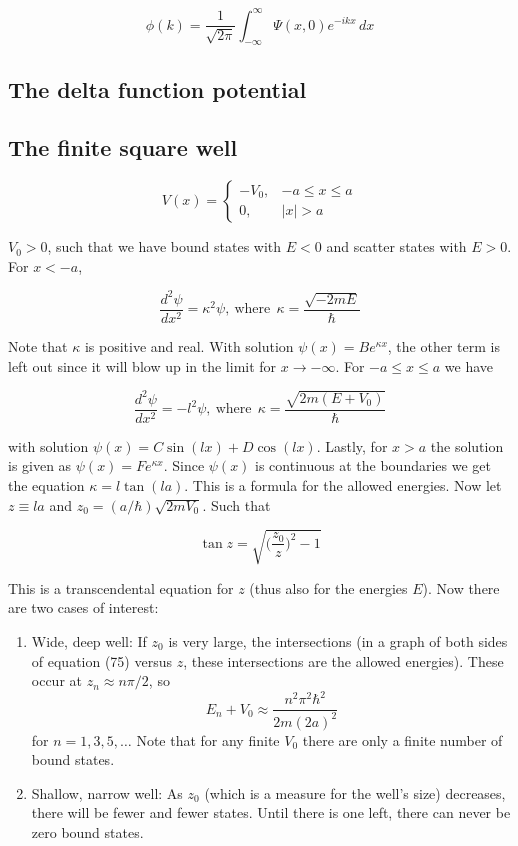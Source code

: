 \documentclass[a4paper]{article}
\begin{document}
\begin{equation}
	\phi(k)=\frac{1}{\sqrt{2\pi}}\int_{-\infty}^{\infty}\Psi(x,0)e^{-ikx}\,dx
\end{equation}

\subsection{The delta function potential}

\subsection{The finite square well}

\[V(x) = \left\{
\begin{array}{lr}
-V_0, &-a \le x \le a\\
0, &|x|>a
\end{array}
\right.
\]

$V_0>0$, such that we have bound states with $E<0$ and scatter states with $E>0$. For $x<-a$, 

\begin{equation}
	\frac{d^2\psi}{dx^2}=\kappa^2\psi, \ \text{where}\ \ \kappa=\frac{\sqrt{-2mE}}{\hbar}
\end{equation}

Note that $\kappa$ is positive and real. With solution $\psi(x)=Be^{\kappa x}$, the other term is left out since it will blow up in the limit for $x\rightarrow -\infty$. For $-a\le x\le a$ we have


\begin{equation}
\frac{d^2\psi}{dx^2}=-l^2\psi, \ \text{where}\ \ \kappa=\frac{\sqrt{2m(E+V_0)}}{\hbar}
\end{equation}

with solution $\psi(x)=C\sin(lx)+D\cos(lx)$. Lastly, for $x>a$ the solution is given as $\psi(x)=Fe^{\kappa x}$. Since $\psi(x)$ is continuous at the boundaries we get the equation $\kappa=l\tan(la)$. This is a formula for the allowed energies. Now let $z\equiv la$ and $z_0=(a/\hbar )\sqrt{2mV_0}$. Such that 

\begin{equation}
	\tan z = \sqrt{\bigg(\frac{z_0}{z}\bigg)^2-1}
\end{equation}

This is a transcendental equation for $z$ (thus also for the energies $E$). Now there are two cases of interest:

\begin{enumerate}
	\item Wide, deep well: If $z_0$ is very large, the intersections (in a graph of both sides of equation (75) versus $z$, these intersections are the allowed energies). These occur at $z_n\approx n\pi/2$, so $$E_n+V_0\approx\frac{n^2\pi^2\hbar^2}{2m(2a)^2}$$ for $n=1,3,5,\dots$ Note that for any finite $V_0$ there are only a finite number of bound states.
	\item Shallow, narrow well: As $z_0$ (which is a measure for the well's size) decreases, there will be fewer and fewer states. Until there is one left, there can never be zero bound states.  
\end{enumerate}
\end{document}
